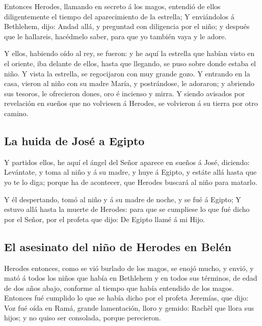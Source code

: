  Entonces Herodes, llamando en secreto á los magos,
entendió de ellos diligentemente el tiempo del aparecimiento de la
estrella;  Y enviándolos á Bethlehem, dijo: Andad allá, y
preguntad con diligencia por el niño; y después que le hallareis,
hacédmelo saber, para que yo también vaya y le adore.

 Y ellos, habiendo oído al rey, se fueron: y he aquí la
estrella que habían visto en el oriente, iba delante de ellos, hasta que
llegando, se puso sobre donde estaba el niño.  Y vista la
estrella, se regocijaron con muy grande gozo.  Y entrando
en la casa, vieron al niño con su madre María, y postrándose, le
adoraron; y abriendo sus tesoros, le ofrecieron dones, oro é incienso y
mirra.  Y siendo avisados por revelación en sueños que no
volviesen á Herodes, se volvieron á su tierra por otro camino.

\hypertarget{la-huida-de-josuxe9-a-egipto}{%
\subsection{La huida de José a
Egipto}\label{la-huida-de-josuxe9-a-egipto}}

 Y partidos ellos, he aquí el ángel del Señor aparece en
sueños á José, diciendo: Levántate, y toma al niño y á su madre, y huye
á Egipto, y estáte allá hasta que yo te lo diga; porque ha de acontecer,
que Herodes buscará al niño para matarlo.

 Y él despertando, tomó al niño y á su madre de noche, y
se fué á Egipto;  Y estuvo allá hasta la muerte de
Herodes: para que se cumpliese lo que fué dicho por el Señor, por el
profeta que dijo: De Egipto llamé á mi Hijo.

\hypertarget{el-asesinato-del-niuxf1o-de-herodes-en-beluxe9n}{%
\subsection{El asesinato del niño de Herodes en
Belén}\label{el-asesinato-del-niuxf1o-de-herodes-en-beluxe9n}}

 Herodes entonces, como se vió burlado de los magos, se
enojó mucho, y envió, y mató á todos los niños que había en Bethlehem y
en todos sus términos, de edad de dos años abajo, conforme al tiempo que
había entendido de los magos.  Entonces fué cumplido lo
que se había dicho por el profeta Jeremías, que dijo: 
Voz fué oída en Ramá, grande lamentación, lloro y gemido: Rachêl que
llora sus hijos; y no quiso ser consolada, porque perecieron.

